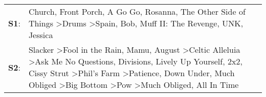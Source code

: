 \begin{supertabular}{p{0.03\textwidth}p{0.92\textwidth}}
 \textbf{S1}:  &                                                                                                                                                                                                                                                                                                                                                                            Church\textsuperscript{}, \enspace Front Porch\textsuperscript{}, \enspace A Go Go\textsuperscript{}, \enspace Rosanna\textsuperscript{}, \enspace The Other Side of Things\textsuperscript{} \textgreater \enspace Drums\textsuperscript{} \textgreater \enspace Spain\textsuperscript{}, \enspace Bob\textsuperscript{}, \enspace Muff II: The Revenge\textsuperscript{}, \enspace UNK\textsuperscript{}, \enspace Jessica\textsuperscript{}  \enspace  \\
 \textbf{S2}:  &  Slacker\textsuperscript{} \textgreater \enspace Fool in the Rain\textsuperscript{}, \enspace Mamu\textsuperscript{}, \enspace August\textsuperscript{} \textgreater \enspace Celtic Alleluia\textsuperscript{} \textgreater \enspace Ask Me No Questions\textsuperscript{}, \enspace Divisions\textsuperscript{}, \enspace Lively Up Yourself\textsuperscript{}, \enspace 2x2\textsuperscript{}, \enspace Cissy Strut\textsuperscript{} \textgreater \enspace Phil's Farm\textsuperscript{} \textgreater \enspace Patience\textsuperscript{}, \enspace Down Under\textsuperscript{}, \enspace Much Obliged\textsuperscript{} \textgreater \enspace Big Bottom\textsuperscript{} \textgreater \enspace Pow\textsuperscript{} \textgreater \enspace Much Obliged\textsuperscript{}, \enspace All In Time\textsuperscript{}  \enspace  \\
\end{supertabular}
